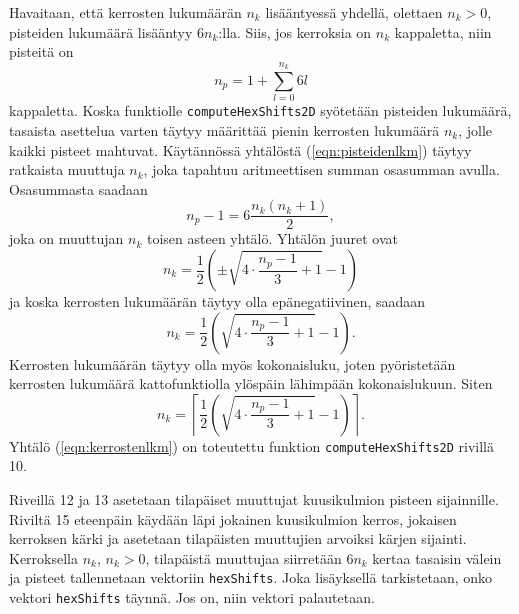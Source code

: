 Havaitaan, että kerrosten lukumäärän $n_k$ lisääntyessä yhdellä, olettaen $n_k>0$, pisteiden lukumäärä lisääntyy $6n_k$:lla. Siis, jos kerroksia on $n_k$ kappaletta, niin pisteitä on
\begin{equation}\label{eqn:pisteidenlkm}
    n_p=1+\sum\limits_{l=0}^{n_k}6l
\end{equation}
kappaletta. Koska funktiolle \texttt{computeHexShifts2D} syötetään pisteiden lukumäärä, tasaista asettelua varten täytyy määrittää pienin kerrosten lukumäärä $n_k$, jolle kaikki pisteet mahtuvat. Käytännössä yhtälöstä (\ref{eqn:pisteidenlkm}) täytyy ratkaista muuttuja $n_k$, joka tapahtuu aritmeettisen summan osasumman\cite{harjulehto_analyysia_2022} avulla. Osasummasta saadaan
\begin{equation*}
    n_p-1=6\frac{n_k(n_k+1)}{2},
\end{equation*}
joka on muuttujan $n_k$ toisen asteen yhtälö. Yhtälön juuret ovat
\begin{equation*}
    n_k=\frac{1}{2}\left( \pm\sqrt{4\cdot\frac{n_p - 1}{3} + 1} - 1 \right)
\end{equation*}
ja koska kerrosten lukumäärän täytyy olla epänegatiivinen, saadaan
\begin{equation*}
    n_k=\frac{1}{2}\left( \sqrt{4\cdot\frac{n_p - 1}{3} + 1} - 1 \right).
\end{equation*}
Kerrosten lukumäärän täytyy olla myös kokonaisluku, joten pyöristetään kerrosten lukumäärä kattofunktiolla ylöspäin lähimpään kokonaislukuun. Siten
\begin{equation}\label{eqn:kerrostenlkm}
    n_k=\left\lceil\frac{1}{2}\left( \sqrt{4\cdot\frac{n_p - 1}{3} + 1} - 1 \right)\right\rceil.
\end{equation}
Yhtälö (\ref{eqn:kerrostenlkm}) on toteutettu funktion \texttt{computeHexShifts2D} rivillä 10.

Riveillä 12 ja 13 asetetaan tilapäiset muuttujat kuusikulmion pisteen sijainnille. Riviltä 15 eteenpäin käydään läpi jokainen kuusikulmion kerros, jokaisen kerroksen kärki ja asetetaan tilapäisten muuttujien arvoiksi kärjen sijainti. Kerroksella $n_k$, $n_k>0$, tilapäistä muuttujaa siirretään $6n_k$ kertaa tasaisin välein ja pisteet tallennetaan vektoriin \texttt{hexShifts}. Joka lisäyksellä tarkistetaan, onko vektori \texttt{hexShifts} täynnä. Jos on, niin vektori palautetaan.

